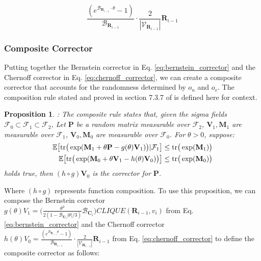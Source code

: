 \documentclass{article}
\def\mC{{\mathbf{C}}}
\def\mM{{\mathbf{M}}}
\def\mP{{\mathbf{P}}}
\def\mR{{\mathbf{R}}}
\def\mU{{\mathbf{U}}}
\def\mV{{\mathbf{V}}}
\def\gV{{\mathcal{V}}}
\theoremstyle{plain}
\newtheorem{proposition}[theorem]{Proposition}
\theoremstyle{definition}
\theoremstyle{remark}
\begin{document}
\begin{equation}
\label{eq:chernoff_corrector}
\frac{(e^{\mathcal{B}_{\mR_{i-1}}\cdot \theta} - 1)}{\mathcal{B}_{\mR_{i-1}}} \cdot \frac{2}{|\gV_{\mR_{i-1}}|} \mR_{i-1}
\end{equation}


\subsubsection{Composite Corrector}

Putting together the Bernstein corrector in Eq. \ref{eq:bernstein_corrector} and the Chernoff corrector in Eq. \ref{eq:chernoff_corrector}, we can create a composite corrector that accounts for the randomness determined by $o_n$ and $o_v$. The composition rule stated and proved in section 7.3.7 of \citet{tropp2019matrix} is defined here for context.

\begin{proposition}
\label{prop:corrector_composition}
\citep{tropp2019matrix} : The composite rule states that, given the sigma fields $\mathcal{F}_0 \subset \mathcal{F}_1 \subset \mathcal{F}_2$, Let $\mP$ be a random matrix measurable over $\mathcal{F}_2$, $\mV_1, \mM_1$ are measurable over $\mathcal{F}_1$, $\mV_0, \mM_0$ are measurable over $\mathcal{F}_0$. For $\theta > 0$, suppose:
\begin{align*}
\begin{split}
\mathbb{E} \big[ \textnormal{tr} \big(\exp (\mM_1 + \theta \mP - g(\theta)\mV_1)\big) | \mathcal{F}_1 \big] &\le \textnormal{tr}\big(\exp(\mM_1)\big) \\
\mathbb{E} \big[ \textnormal{tr}\big(\exp (\mM_0 + \theta \mV_1 - h(\theta)\mV_0)\big)\big] &\le \textnormal{tr}\big(\exp(\mM_0)\big)
\end{split}
\end{align*}
holds true, then $(h \circ g)\mV_0$ is the corrector for $\mP$.
\end{proposition}

Where $(h \circ g)$ represents function composition. To use this proposition, we can compose the Bernstein corrector $g(\theta)V_1 = \big( \frac{\theta^2}{2 (1 - \mathcal{B}_{\mU_i}|\theta|/3)}\mathcal{B}_{\mC_i}  \big ) \textit{CLIQUE}(\mR_{i-1}, v_i)$ from Eq. \ref{eq:bernstein_corrector} and the Chernoff corrector $h(\theta)V_0 = \frac{(e^{\mathcal{B}_{\mR_{i-1}}\theta} - 1)}{\mathcal{B}_{\mR_{i-1}}} \cdot \frac{2}{|\gV_{\mR_{i-1}}|} \mR_{i-1} $ from Eq. \ref{eq:chernoff_corrector} to define the composite corrector as follows:
\end{document}
